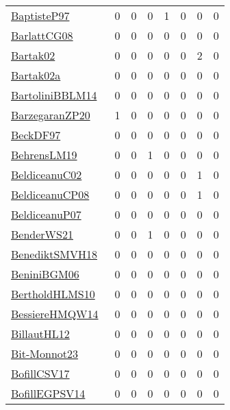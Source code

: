 {\begin{longtable}{l*{7}{r}}
\href{papers/BaptisteP97.pdf}{BaptisteP97}~\cite{BaptisteP97} & 0 & 0 & 0 & 1 & 0 & 0 & 0\\
\href{papers/BarlattCG08.pdf}{BarlattCG08}~\cite{BarlattCG08} & 0 & 0 & 0 & 0 & 0 & 0 & 0\\
\href{papers/Bartak02.pdf}{Bartak02}~\cite{Bartak02} & 0 & 0 & 0 & 0 & 0 & 2 & 0\\
\href{papers/Bartak02a.pdf}{Bartak02a}~\cite{Bartak02a} & 0 & 0 & 0 & 0 & 0 & 0 & 0\\
\href{papers/BartoliniBBLM14.pdf}{BartoliniBBLM14}~\cite{BartoliniBBLM14} & 0 & 0 & 0 & 0 & 0 & 0 & 0\\
\href{papers/BarzegaranZP20.pdf}{BarzegaranZP20}~\cite{BarzegaranZP20} & 1 & 0 & 0 & 0 & 0 & 0 & 0\\
\href{papers/BeckDF97.pdf}{BeckDF97}~\cite{BeckDF97} & 0 & 0 & 0 & 0 & 0 & 0 & 0\\
\href{papers/BehrensLM19.pdf}{BehrensLM19}~\cite{BehrensLM19} & 0 & 0 & 1 & 0 & 0 & 0 & 0\\
\href{papers/BeldiceanuC02.pdf}{BeldiceanuC02}~\cite{BeldiceanuC02} & 0 & 0 & 0 & 0 & 0 & 1 & 0\\
\href{papers/BeldiceanuCP08.pdf}{BeldiceanuCP08}~\cite{BeldiceanuCP08} & 0 & 0 & 0 & 0 & 0 & 1 & 0\\
\href{papers/BeldiceanuP07.pdf}{BeldiceanuP07}~\cite{BeldiceanuP07} & 0 & 0 & 0 & 0 & 0 & 0 & 0\\
\href{papers/BenderWS21.pdf}{BenderWS21}~\cite{BenderWS21} & 0 & 0 & 1 & 0 & 0 & 0 & 0\\
\href{papers/BenediktSMVH18.pdf}{BenediktSMVH18}~\cite{BenediktSMVH18} & 0 & 0 & 0 & 0 & 0 & 0 & 0\\
\href{papers/BeniniBGM06.pdf}{BeniniBGM06}~\cite{BeniniBGM06} & 0 & 0 & 0 & 0 & 0 & 0 & 0\\
\href{papers/BertholdHLMS10.pdf}{BertholdHLMS10}~\cite{BertholdHLMS10} & 0 & 0 & 0 & 0 & 0 & 0 & 0\\
\href{papers/BessiereHMQW14.pdf}{BessiereHMQW14}~\cite{BessiereHMQW14} & 0 & 0 & 0 & 0 & 0 & 0 & 0\\
\href{papers/BillautHL12.pdf}{BillautHL12}~\cite{BillautHL12} & 0 & 0 & 0 & 0 & 0 & 0 & 0\\
\href{papers/Bit-Monnot23.pdf}{Bit-Monnot23}~\cite{Bit-Monnot23} & 0 & 0 & 0 & 0 & 0 & 0 & 0\\
\href{papers/BofillCSV17.pdf}{BofillCSV17}~\cite{BofillCSV17} & 0 & 0 & 0 & 0 & 0 & 0 & 0\\
\href{papers/BofillEGPSV14.pdf}{BofillEGPSV14}~\cite{BofillEGPSV14} & 0 & 0 & 0 & 0 & 0 & 0 & 0\\

\end{longtable}}
